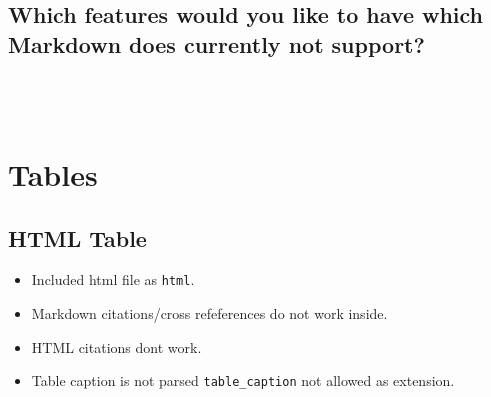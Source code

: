 \documentclass[
  british,
  12pt,
  paper=a4,
  twoside,
  titlepage=true,
  openright,
  abstract=on,
  toc=listofnumbered,
  numbers=noenddot,
  chapterprefix=true,
  headings=optiontohead,
  svgnames,
  dvipsnames]{scrreprt}
\providecommand{\tightlist}{%
  \setlength{\itemsep}{0pt}\setlength{\parskip}{0pt}}
\begin{document}
\hypertarget{which-features-would-you-like-to-have-which-markdown-does-currently-not-support}{%
\subsection*{Which features would you like to have which Markdown does
currently not
support?}\label{which-features-would-you-like-to-have-which-markdown-does-currently-not-support}}

\xhrule[,fill=1.0000\textwidth,thickness=0.5pt]\\
\xhrule[,fill=1.0000\textwidth,thickness=0.5pt]\\
\xhrule[,fill=1.0000\textwidth,thickness=0.5pt]

\hypertarget{tables}{%
\section{Tables}\label{tables}}

\hypertarget{html-table}{%
\subsection{HTML Table}\label{html-table}}

\begin{itemize}
\tightlist
\item
  Included html file as \texttt{html}.
\item
  Markdown citations/cross refeferences do not work inside.
\item
  HTML citations dont work.
\item
  Table caption is not parsed \texttt{table\_caption} not allowed as
  extension.
\end{itemize}
\end{document}
